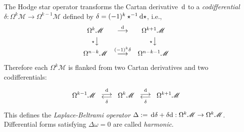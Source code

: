 The Hodge star operator transforms the Cartan derivative $\,\mathrm{d}$ to a \emph{codifferential} $\delta: \Omega^k \mathscr{M} \to \Omega^{k-1} \mathscr{M}$
defined by $\delta = (-1)^k \star^{-1}\! \,\mathrm{d} \star$, i.e.,
\begin{equation}
	\begin{array}{ccc}
		\Omega^k \mathscr{M} & \stackrel{\,\mathrm{d}\,}{\longrightarrow} & \Omega^{k+1} \mathscr{M}
		\\ [.75ex]
		{\scriptstyle \star} \big\downarrow & & {\scriptstyle \star} \big\downarrow
		\\ [.25ex]
		\Omega^{n-k} \mathscr{M} & \stackrel{(-1)^k \delta}{\longrightarrow} & \Omega^{n-k-1} \mathscr{M}
	\end{array}
	\label{eq:Cartan-derivative-and-codifferential}
\end{equation}
Therefore each $\Omega^k \mathscr{M}$ is flanked from two Cartan derivatives and two codifferentials:
\begin{equation}
	\Omega^{k-1} \mathscr{M}
	\
	\begin{array}{c}
		{\scriptstyle \,\mathrm{d}\,} \\ [-1.25ex] 
		\longrightarrow \\ [-1.9ex]
		\longleftarrow  \\ [-1.25ex] 
		{\scriptstyle \delta}
	\end{array}
	\
	\Omega^{k} \mathscr{M}
	\
	\begin{array}{c}
		{\scriptstyle \,\mathrm{d}\,} \\ [-1.25ex] 
		\longrightarrow \\ [-1.9ex]
		\longleftarrow  \\ [-1.25ex] 
		{\scriptstyle \delta}
	\end{array}
	\
	\Omega^{k+1} \mathscr{M}
\end{equation}
This defines the \emph{Laplace-Beltrami operator}
$\Delta := \,\mathrm{d} \delta + \delta \!\,\mathrm{d}: \Omega^{k} \mathscr{M} \to \Omega^{k} \mathscr{M}$.
Differential forms satisfying $\Delta \omega = 0$ are called \emph{harmonic}.

